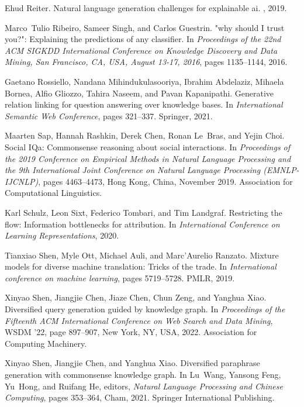 \documentclass[11pt]{article}
\begin{document}
\begin{thebibliography}{100}
Ehud Reiter.
\newblock Natural language generation challenges for explainable ai.
, 2019.

Marco~Tulio Ribeiro, Sameer Singh, and Carlos Guestrin.
\newblock "why should {I} trust you?": Explaining the predictions of any
  classifier.
\newblock In {\em Proceedings of the 22nd {ACM} {SIGKDD} International
  Conference on Knowledge Discovery and Data Mining, San Francisco, CA, USA,
  August 13-17, 2016}, pages 1135--1144, 2016.

Gaetano Rossiello, Nandana Mihindukulasooriya, Ibrahim Abdelaziz, Mihaela
  Bornea, Alfio Gliozzo, Tahira Naseem, and Pavan Kapanipathi.
\newblock Generative relation linking for question answering over knowledge
  bases.
\newblock In {\em International Semantic Web Conference}, pages 321--337.
  Springer, 2021.

Maarten Sap, Hannah Rashkin, Derek Chen, Ronan Le~Bras, and Yejin Choi.
\newblock Social {IQ}a: Commonsense reasoning about social interactions.
\newblock In {\em Proceedings of the 2019 Conference on Empirical Methods in
  Natural Language Processing and the 9th International Joint Conference on
  Natural Language Processing (EMNLP-IJCNLP)}, pages 4463--4473, Hong Kong,
  China, November 2019. Association for Computational Linguistics.

Karl Schulz, Leon Sixt, Federico Tombari, and Tim Landgraf.
\newblock Restricting the flow: Information bottlenecks for attribution.
\newblock In {\em International Conference on Learning Representations}, 2020.

Tianxiao Shen, Myle Ott, Michael Auli, and Marc’Aurelio Ranzato.
\newblock Mixture models for diverse machine translation: Tricks of the trade.
\newblock In {\em International conference on machine learning}, pages
  5719--5728. PMLR, 2019.

Xinyao Shen, Jiangjie Chen, Jiaze Chen, Chun Zeng, and Yanghua Xiao.
\newblock Diversified query generation guided by knowledge graph.
\newblock In {\em Proceedings of the Fifteenth ACM International Conference on
  Web Search and Data Mining}, WSDM '22, page 897–907, New York, NY, USA,
  2022. Association for Computing Machinery.

Xinyao Shen, Jiangjie Chen, and Yanghua Xiao.
\newblock Diversified paraphrase generation with commonsense knowledge graph.
\newblock In Lu~Wang, Yansong Feng, Yu~Hong, and Ruifang He, editors, {\em
  Natural Language Processing and Chinese Computing}, pages 353--364, Cham,
  2021. Springer International Publishing.


\end{thebibliography}
\end{document}
